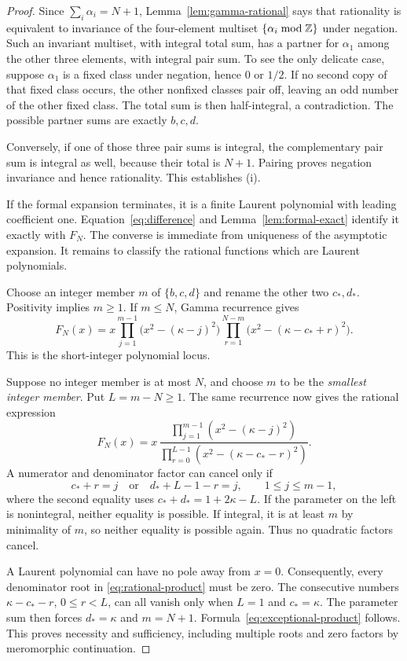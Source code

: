 \documentclass[11pt,a4paper]{article}
\numberwithin{equation}{section}
\theoremstyle{definition}\newtheorem{definition}[theorem]{Definition}
\theoremstyle{remark}\newtheorem{remark}[theorem]{Remark}
\begin{document}
\begin{proof}
Since $\sum_i\alpha_i=N+1$, Lemma~\ref{lem:gamma-rational} says that
rationality is equivalent to invariance of the four-element multiset
$\{\alpha_i\bmod\mathbb Z\}$ under negation. Such an invariant multiset,
with integral total sum, has a partner for $\alpha_1$ among the
other three elements, with integral pair sum. To see the only delicate
case, suppose $\alpha_1$ is a fixed class under negation, hence $0$
or $1/2$. If no second copy of that fixed class occurs, the other
nonfixed classes pair off, leaving an odd number of the other fixed
class. The total sum is then half-integral, a contradiction.
The possible partner sums are exactly $b,c,d$.

Conversely, if one of those three pair sums is integral, the
complementary pair sum is integral as well, because their total is
$N+1$. Pairing proves negation invariance and hence rationality.
This establishes (i).

If the formal expansion terminates, it is a finite Laurent polynomial
with leading coefficient one. Equation~\eqref{eq:difference} and
Lemma~\ref{lem:formal-exact} identify it exactly with $F_N$.
The converse is immediate from uniqueness of the asymptotic expansion.
It remains to classify the rational functions which are Laurent
polynomials.

Choose an integer member $m$ of $\{b,c,d\}$ and rename the other two
$c_*,d_*$. Positivity implies $m\ge1$. If $m\le N$, Gamma recurrence
gives
\begin{equation}
 F_N(x)=x\prod_{j=1}^{m-1}\bigl(x^2-(\kappa-j)^2\bigr)
          \prod_{r=1}^{N-m}\bigl(x^2-(\kappa-c_*+r)^2\bigr).
 \label{eq:polynomial-product}
\end{equation}
This is the short-integer polynomial locus.

Suppose no integer member is at most $N$, and choose $m$ to be the
\emph{smallest integer member}. Put $L=m-N\ge1$. The same recurrence
now gives the rational expression
\begin{equation}
 F_N(x)=x\,
 \frac{\displaystyle\prod_{j=1}^{m-1}(x^2-(\kappa-j)^2)}
 {\displaystyle\prod_{r=0}^{L-1}(x^2-(\kappa-c_*-r)^2)}.
 \label{eq:rational-product}
\end{equation}
A numerator and denominator factor can cancel only if
\[
 c_*+r=j\quad\text{or}\quad d_*+L-1-r=j,
 \qquad 1\le j\le m-1,
\]
where the second equality uses $c_*+d_*=1+2\kappa-L$.
If the parameter on the left is nonintegral, neither equality is
possible. If integral, it is at least $m$ by minimality of $m$,
so neither equality is possible again. Thus no quadratic factors
cancel.

A Laurent polynomial can have no pole away from $x=0$. Consequently,
every denominator root in \eqref{eq:rational-product} must be zero.
The consecutive numbers $\kappa-c_*-r$, $0\le r<L$, can all vanish
only when $L=1$ and $c_*=\kappa$. The parameter sum then forces
$d_*=\kappa$ and $m=N+1$. Formula~\eqref{eq:exceptional-product}
follows. This proves necessity and sufficiency, including multiple
roots and zero factors by meromorphic continuation.
\end{proof}
\end{document}
